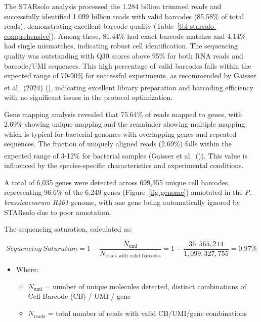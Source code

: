 \documentclass[
  11pt,
  a4paper,
]{report}
\providecommand{\tightlist}{%
  \setlength{\itemsep}{0pt}\setlength{\parskip}{0pt}}\usepackage{longtable,booktabs,array}
\begin{document}
The STARsolo analysis processed the 1.284 billion trimmed reads and
successfully identified 1.099 billion reads with valid barcodes (85.58\%
of total reads), demonstrating excellent barcode quality
(Table~\ref{tbl-starsolo-comprehensive}). Among these, 81.44\% had exact
barcode matches and 4.14\% had single mismatches, indicating robust cell
identification. The sequencing quality was outstanding with Q30 scores
above 95\% for both RNA reads and barcode/UMI sequences. This high
percentage of valid barcodes falls within the expected range of 70-90\%
for successful experiments, as recommended by Gaisser et al.~(2024)
(\textsuperscript{}), indicating excellent
library preparation and barcoding efficiency with no significant issues
in the protocol optimization.

Gene mapping analysis revealed that 75.64\% of reads mapped to genes,
with 2.69\% showing unique mapping and the remainder showing multiple
mapping, which is typical for bacterial genomes with overlapping genes
and repeated sequences. The fraction of uniquely aligned reads (2.69\%)
falls within the expected range of 3-12\% for bacterial samples (Gaisser
et al.~(\textsuperscript{})). This value
is influenced by the species-specific characteristics and experimental
conditions.

A total of 6,035 genes were detected across 699,355 unique cell
barcodes, representing 96.6\% of the 6,249 genes
(Figure~\ref{fig-genome}) annotated in the \emph{P. brassicacearum R401}
genome, with one gene being automatically ignored by STARsolo due to
poor annotation.

The sequencing saturation, calculated as:

\[ Sequencing\ Saturation = 1 - \frac{N_{\text{umi}}}{N_{\text{reads with valid barcodes}}} = 1 - \frac{36,565,214}{1,099,327,755} = 0.97\% \]

\begin{itemize}
\tightlist
\item
  Where:

  \begin{itemize}
  \tightlist
  \item
    \(N_{\text{umi}}\) = number of unique molecules detected, distinct
    combinations of Cell Barcode (CB) / UMI / gene
  \item
    \(N_{\text{reads}}\) = total number of reads with valid CB/UMI/gene
    combinations
  \end{itemize}
\end{itemize}
\end{document}
